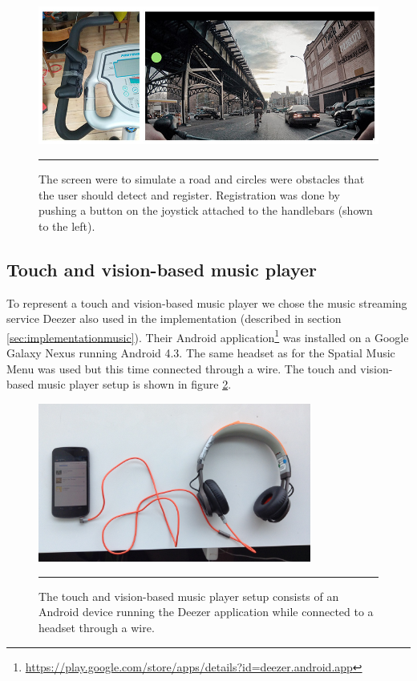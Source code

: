 \begin{figure}[h]
	\centering
		\includegraphics[width=\textwidth,height=\textheight,keepaspectratio]{./Figures/simulation_system.jpg}
		\rule{35em}{1pt}
	\caption[Simulation screen]{The screen were to simulate a road and circles were obstacles that the user should detect and register. Registration was done by pushing a button on the joystick attached to the handlebars (shown to the left).}
	\label{fig:simulationsystem}
\end{figure}

\subsection{Touch and vision-based music player}
To represent a touch and vision-based music player we chose the music streaming service Deezer also used in the implementation (described in section \ref{sec:implementationmusic}). Their Android application\footnote{\url{https://play.google.com/store/apps/details?id=deezer.android.app}} was installed on a Google Galaxy Nexus running Android 4.3. The same headset as for the Spatial Music Menu was used but this time connected through a wire. The touch and vision-based music player setup is shown in figure \ref{fig:touchandvisionsystem}.

\begin{figure}[h]
	\centering
		\includegraphics[width=0.8\textwidth,height=\textheight,keepaspectratio]{./Figures/evaluation_visionplayer.jpg}
		\rule{35em}{1pt}
	\caption[Touch and vision-based system]{The touch and vision-based music player setup consists of an Android device running the Deezer application while connected to a headset through a wire.}
	\label{fig:touchandvisionsystem}
\end{figure}

